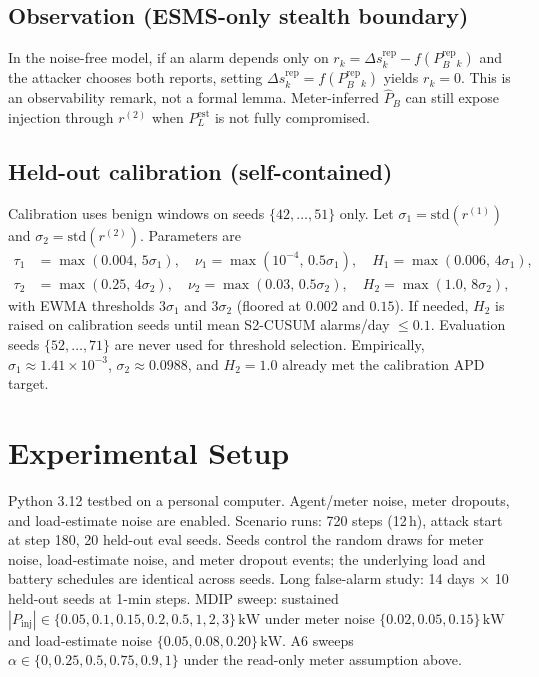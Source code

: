 \documentclass[conference]{IEEEtran}
\begin{document}
\subsection{Observation (ESMS-only stealth boundary)}
In the noise-free model, if an alarm depends only on $r_k=\Delta s^{\mathrm{rep}}_k-f(P_B^{\mathrm{rep}}_k)$ and the attacker chooses both reports, setting $\Delta s^{\mathrm{rep}}_k=f(P_B^{\mathrm{rep}}_k)$ yields $r_k=0$. This is an observability remark, not a formal lemma. Meter-inferred $\hat{P}_B$ can still expose injection through $r^{(2)}$ when $P_L^{\mathrm{est}}$ is not fully compromised.

\subsection{Held-out calibration (self-contained)}
Calibration uses benign windows on seeds $\{42,\ldots,51\}$ only. Let $\sigma_1=\mathrm{std}(r^{(1)})$ and $\sigma_2=\mathrm{std}(r^{(2)})$. Parameters are
\begin{align}
\tau_1 &= \max(0.004,\,5\sigma_1),\quad
\nu_1 = \max(10^{-4},\,0.5\sigma_1),\quad
H_1 = \max(0.006,\,4\sigma_1),\\
\tau_2 &= \max(0.25,\,4\sigma_2),\quad
\nu_2 = \max(0.03,\,0.5\sigma_2),\quad
H_2 = \max(1.0,\,8\sigma_2),
\end{align}
with EWMA thresholds $3\sigma_1$ and $3\sigma_2$ (floored at $0.002$ and $0.15$). If needed, $H_2$ is raised on calibration seeds until mean S2-CUSUM alarms/day $\le 0.1$. Evaluation seeds $\{52,\ldots,71\}$ are never used for threshold selection. Empirically, $\sigma_1\approx 1.41\times 10^{-3}$, $\sigma_2\approx 0.0988$, and $H_2=1.0$ already met the calibration APD target.

\section{Experimental Setup}
Python 3.12 testbed on a personal computer. Agent/meter noise, meter dropouts, and load-estimate noise are enabled. Scenario runs: 720 steps (12\,h), attack start at step 180, 20 held-out eval seeds. Seeds control the random draws for meter noise, load-estimate noise, and meter dropout events; the underlying load and battery schedules are identical across seeds. Long false-alarm study: 14 days $\times$ 10 held-out seeds at 1-min steps. MDIP sweep: sustained $|P_{\mathrm{inj}}|\in\{0.05,0.1,0.15,0.2,0.5,1,2,3\}\,\mathrm{kW}$ under meter noise $\{0.02,0.05,0.15\}\,\mathrm{kW}$ and load-estimate noise $\{0.05,0.08,0.20\}\,\mathrm{kW}$. A6 sweeps $\alpha\in\{0,0.25,0.5,0.75,0.9,1\}$ under the read-only meter assumption above.
\end{document}
